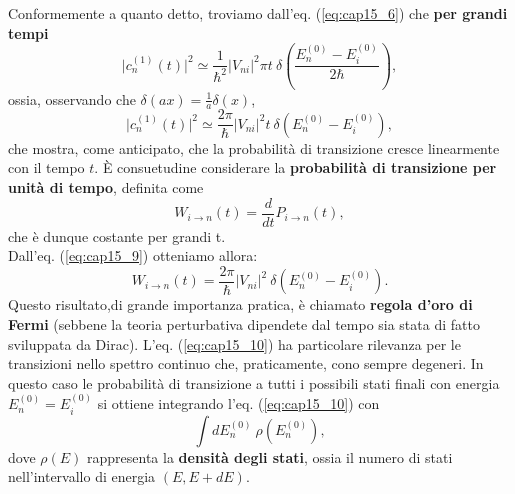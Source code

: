Conformemente a quanto detto, troviamo dall'eq. (\ref{eq:cap15_6}) che \textbf{per grandi tempi}
\begin{equation}
\vert c_n ^{(1)} (t) \vert ^2 \simeq \frac{1}{\hbar ^2} \vert V_{ni} \vert ^2 \pi t\ \delta\left(\frac{E_n ^{(0)}-E_i ^{(0)}}{2\hbar} \right),
\end{equation}
ossia, osservando che $\delta (ax) = \frac{1}{a} \delta (x)$,
\begin{equation}
\vert c_n ^{(1)} (t) \vert ^2 \simeq \frac{2\pi}{\hbar } \vert V_{ni} \vert ^2  t\ \delta (E_n ^{(0)}-E_i ^{(0)} ),
\label{eq:cap15_9}
\end{equation}
che mostra, come anticipato, che la probabilità di transizione cresce linearmente con il tempo $t$.
È consuetudine considerare la \textbf{probabilità di transizione per unità di tempo}, definita come
\begin{equation}
W_{i\rightarrow n} (t) =\frac{d}{dt} P_{i\rightarrow n} (t),
\end{equation}
che è dunque costante per grandi t.\\
Dall'eq. (\ref{eq:cap15_9}) otteniamo allora:
\begin{equation}
W_{i\rightarrow n} (t) = \frac{2\pi}{\hbar } \vert V_{ni} \vert ^2\ \delta (E_n ^{(0)}-E_i ^{(0)} ).
\label{eq:cap15_10}
\end{equation}
Questo risultato,di grande importanza pratica, è chiamato \textbf{regola d'oro di Fermi} (sebbene la teoria perturbativa dipendete dal tempo sia stata di fatto sviluppata da Dirac).		
L'eq. (\ref{eq:cap15_10}) ha particolare rilevanza per le transizioni nello spettro continuo che, praticamente, cono sempre degeneri. In questo caso le probabilità di transizione a tutti i possibili stati finali con energia $E_n ^{(0)}= E_i ^{(0)}$ si ottiene integrando l'eq. (\ref{eq:cap15_10}) con
\begin{equation}
\int dE_n ^{(0)} \ \rho (E_n ^{(0)}),
\end{equation}
dove $\rho (E)$ rappresenta la \textbf{densità degli stati}, ossia il numero di stati nell'intervallo di energia $(E, E+dE)$.
